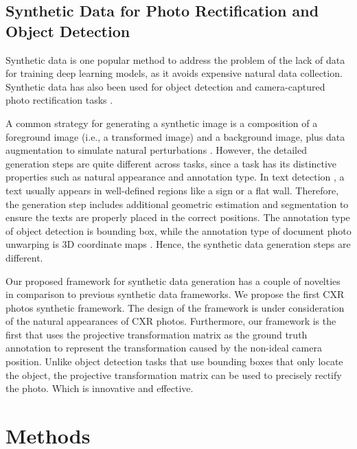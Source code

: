 \documentclass[preprint, 12pt]{elsarticle}
\begin{document}
\subsection{Synthetic Data for Photo Rectification and Object Detection}

Synthetic data is one popular method to address the problem of the lack of data for training deep learning models, as it avoids expensive natural data collection. Synthetic data has also been used for object detection \cite{gupta2016synthetic, dwibedi2017cut, zhan2018verisimilar} and camera-captured photo rectification tasks \cite{ma2018docunet,das2019dewarpnet,bjorklund2019robust}.

A common strategy for generating a synthetic image is a composition of a foreground image (i.e., a transformed image) and a background image, plus data augmentation to simulate natural perturbations \cite{gupta2016synthetic, dwibedi2017cut, zhan2018verisimilar,ma2018docunet,das2019dewarpnet,bjorklund2019robust}. However, the detailed generation steps are quite different across tasks, since a task has its distinctive properties such as natural appearance and annotation type. In text detection \cite{gupta2016synthetic}, a text usually appears in well-defined regions like a sign or a flat wall. Therefore, the generation step includes additional geometric estimation and segmentation to ensure the texts are properly placed in the correct positions. The annotation type of object detection is bounding box, while the annotation type of document photo unwarping is 3D coordinate maps \cite{das2019dewarpnet,ma2018docunet,feng2021docscanner}. Hence, the synthetic data generation steps are different.

Our proposed framework for synthetic data generation has a couple of novelties in comparison to previous synthetic data frameworks. We propose the first CXR photos synthetic framework. The design of the framework is under consideration of the natural appearances of CXR photos. Furthermore, our framework is the first that uses the projective transformation matrix as the ground truth annotation to represent the transformation caused by the non-ideal camera position. Unlike object detection tasks that use bounding boxes that only locate the object, the projective transformation matrix can be used to precisely rectify the photo. Which is innovative and effective.

\section{Methods} \label{sec: Methods}
\end{document}

